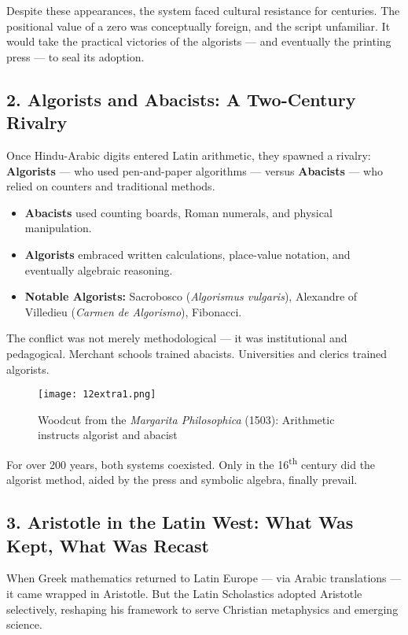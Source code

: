 \documentclass[9pt]{article}
\begin{document}
Despite these appearances, the system faced cultural resistance for centuries. The positional value of a zero was conceptually foreign, and the script unfamiliar.  
It would take the practical victories of the algorists — and eventually the printing press — to seal its adoption.

\subsection*{2. Algorists and Abacists: A Two-Century Rivalry}

Once Hindu-Arabic digits entered Latin arithmetic, they spawned a rivalry:  
\textbf{Algorists} — who used pen-and-paper algorithms — versus \textbf{Abacists} — who relied on counters and traditional methods.

\begin{itemize}
    \item \textbf{Abacists} used counting boards, Roman numerals, and physical manipulation.
    \item \textbf{Algorists} embraced written calculations, place-value notation, and eventually algebraic reasoning.
    \item \textbf{Notable Algorists:} Sacrobosco (\textit{Algorismus vulgaris}), Alexandre of Villedieu (\textit{Carmen de Algorismo}), Fibonacci.
\end{itemize}

The conflict was not merely methodological — it was institutional and pedagogical.  
Merchant schools trained abacists. Universities and clerics trained algorists.

\begin{figure}[H]
\centering
\texttt{[image: 12extra1.png]}
\caption{Woodcut from the \textit{Margarita Philosophica} (1503): Arithmetic instructs algorist and abacist}
\end{figure}

For over 200 years, both systems coexisted. Only in the 16\textsuperscript{th} century did the algorist method, aided by the press and symbolic algebra, finally prevail.

\subsection*{3. Aristotle in the Latin West: What Was Kept, What Was Recast}

When Greek mathematics returned to Latin Europe — via Arabic translations — it came wrapped in Aristotle.  
But the Latin Scholastics adopted Aristotle selectively, reshaping his framework to serve Christian metaphysics and emerging science.
\end{document}
